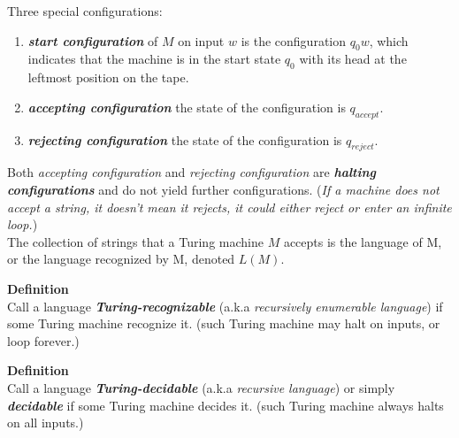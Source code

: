 \documentclass[11pt]{article}
\newcommand{\bemph}[1]{{\bfseries\itshape#1}}
\begin{document}
Three special configurations:
\begin{enumerate}
\item \bemph{start configuration} of $M$ on input $w$ is the
  configuration $q_0w$, which indicates that the machine is in the
  start state $q_0$ with its head at the leftmost position on the
  tape.
\item \bemph{accepting configuration} the state of the configuration is
  $q_{accept}$.
\item \bemph{rejecting configuration} the state of the configuration is
  $q_{reject}$.
\end{enumerate}

Both \emph{accepting configuration} and \emph{rejecting configuration}
are \bemph{halting configurations} and do not yield further
configurations. (\emph{If a machine does not accept a string, it
  doesn't mean it rejects, it could either reject or enter an infinite
loop.})\\

The collection of strings that a Turing machine $M$ accepts is the
language of M, or the language recognized by M, denoted
$L(M)$.

\begin{mdframed}[backgroundcolor=yellow2]
\textbf{Definition}\\
Call a language \bemph{Turing-recognizable} (a.k.a \emph{recursively
  enumerable language}) if some Turing machine
recognize it. (such Turing machine may halt on inputs, or loop forever.)

\end{mdframed}

\begin{mdframed}[backgroundcolor=yellow2]
\textbf{Definition}\\
Call a language \bemph{Turing-decidable} (a.k.a \emph{recursive
  language}) or simply \bemph{decidable} if some Turing machine
decides it. (such Turing machine always halts on all inputs.)

\end{mdframed}
\end{document}
